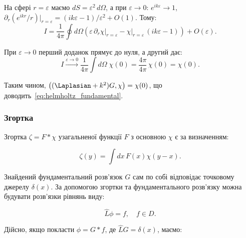 На сфері \( r = \varepsilon \) маємо \( dS = \varepsilon^2\,d\Omega \),
а при \( \varepsilon \to 0 \): \( e^{ik\varepsilon} \to 1 \), \( \partial_r(e^{ikr}/r)\big|_{r=\varepsilon} = (ik\varepsilon - 1)/\varepsilon^2 + O(1) \).
Тому:
\begin{equation*}
    I = \frac{1}{4\pi}\oint d\Omega\left(
        \varepsilon\,\partial_r\chi\big|_{r=\varepsilon}
        - \chi\big|_{r=\varepsilon}\,(ik\varepsilon - 1)
    \right) + O(\varepsilon).
\end{equation*}

При \( \varepsilon \to 0 \) перший доданок прямує до нуля, а другий дає:
\begin{equation*}
    I \xrightarrow{\varepsilon\to 0}
    \frac{1}{4\pi}\int d\Omega\;\chi(0) = \frac{4\pi}{4\pi}\,\chi(0) = \chi(0).
\end{equation*}

Таким чином, \( \bigl((\Laplasian + k^2)G,\chi\bigr) = \chi(0) \), що доводить~\eqref{eq:helmholtz_fundamental}.

\subsubsection{Згортка}

Згортка \( \zeta = F * \chi \) узагальненої функції \( F \) з основною \( \chi \) є за визначенням:

\begin{equation}
\zeta(y) = \int dx \, F(x) \chi(y - x).
\label{eq:convolution}
\end{equation}



Знайдений фундаментальний розв'язок $G$ сам по собі відповідає точковому джерелу $\delta(x)$. За допомогою згортки та фундаментального розв'язку можна будувати розв'язки рівнянь виду:

\begin{equation}
\hat{L} \phi = f, \quad f \in D.
\end{equation}

Дійсно, якщо покласти \( \phi = G * f \), де \( \hat{L} G = \delta(x) \), маємо:

